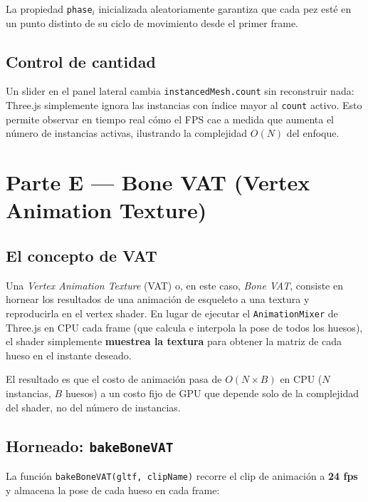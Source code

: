 \documentclass[12pt,a4paper]{article}
\begin{document}
La propiedad \texttt{phase}$_i$ inicializada aleatoriamente garantiza que cada pez
esté en un punto distinto de su ciclo de movimiento desde el primer frame.

\subsection{Control de cantidad}

Un slider en el panel lateral cambia \texttt{instancedMesh.count} sin reconstruir
nada: Three.js simplemente ignora las instancias con índice mayor al \texttt{count}
activo. Esto permite observar en tiempo real cómo el FPS cae a medida que aumenta
el número de instancias activas, ilustrando la complejidad $O(N)$ del enfoque.

\section{Parte E — Bone VAT (Vertex Animation Texture)}

\subsection{El concepto de VAT}

Una \textit{Vertex Animation Texture} (VAT) o, en este caso, \textit{Bone VAT},
consiste en hornear los resultados de una animación de esqueleto a una textura y
reproducirla en el vertex shader. En lugar de ejecutar el \texttt{AnimationMixer}
de Three.js en CPU cada frame (que calcula e interpola la pose de todos los huesos),
el shader simplemente \textbf{muestrea la textura} para obtener la matriz de cada hueso
en el instante deseado.

El resultado es que el costo de animación pasa de $O(N \times B)$ en CPU
($N$ instancias, $B$ huesos) a un costo fijo de GPU que depende solo de la
complejidad del shader, no del número de instancias.

\subsection{Horneado: \texttt{bakeBoneVAT}}

La función \texttt{bakeBoneVAT(gltf, clipName)} recorre el clip de animación a
\textbf{24 fps} y almacena la pose de cada hueso en cada frame:
\end{document}
